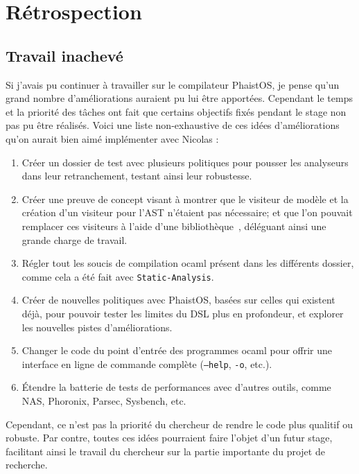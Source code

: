 \section{Rétrospection}
\label{hindsight}

\subsection{Travail inachevé}

Si j'avais pu continuer à travailler sur le compilateur PhaistOS, je pense qu'un grand nombre d'améliorations auraient pu lui être apportées. Cependant le temps et la priorité des tâches ont fait que certains objectifs fixés pendant le stage non pas pu être réalisés. Voici une liste non-exhaustive de ces idées d'améliorations qu'on aurait bien aimé implémenter avec Nicolas :

\begin{enumerate}
    \item Créer un dossier de test avec plusieurs politiques pour pousser les 
    analyseurs dans leur retranchement, testant ainsi leur robustesse.
    \item Créer une preuve de concept visant à montrer que le visiteur de 
    modèle et la création d'un visiteur pour l'AST n'étaient pas nécessaire; et 
    que l'on pouvait remplacer ces visiteurs à l'aide d'une bibliothèque~\cite
    {visitors2021manual}, 
    déléguant ainsi une grande charge de travail.
    \item Régler tout les soucis de compilation ocaml présent dans les 
    différents dossier, comme cela a été fait avec \texttt{Static-Analysis}.
    \item Créer de nouvelles politiques avec PhaistOS, basées sur celles qui 
    existent déjà, pour pouvoir tester les limites du DSL plus en profondeur, 
    et explorer les nouvelles pistes d'améliorations.
    \item Changer le code du point d'entrée des programmes ocaml pour offrir 
    une interface en ligne de commande complète (\texttt{--help}, \texttt{-o}, 
    etc.).
    \item Étendre la batterie de tests de performances avec d'autres outils, 
    comme NAS, Phoronix, Parsec, Sysbench, etc.
\end{enumerate}

Cependant, ce n'est pas la priorité du chercheur de rendre le code plus 
qualitif ou robuste. Par contre, toutes ces idées pourraient faire l'objet d'un 
futur stage, facilitant ainsi le travail du chercheur sur la partie importante 
du projet de recherche. 

